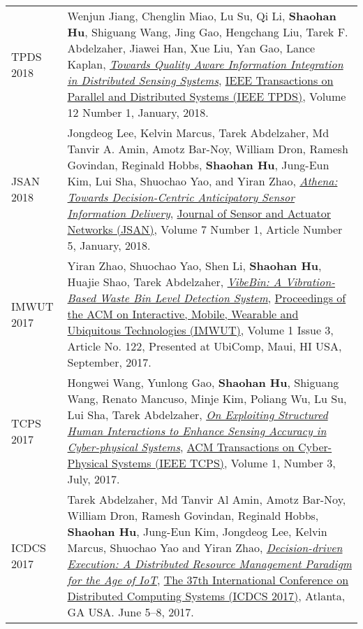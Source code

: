 \begin{longtabu}{p{.51\sectionwidth} p{.78\resumewidth}}
{\sc TPDS 2018}\hypertarget{jiang2018tpds}{} &
Wenjun Jiang, Chenglin Miao, Lu Su, Qi Li, \textbf{Shaohan Hu}, Shiguang Wang, Jing Gao, Hengchang Liu, Tarek F. Abdelzaher, Jiawei Han, Xue Liu, Yan Gao, Lance Kaplan,
\href{http://ieeexplore.ieee.org/document/7940106/}{\emph{Towards Quality Aware Information Integration in Distributed Sensing Systems}},
\href{https://www.computer.org/web/tpds}{\textsf{IEEE Transactions on Parallel and Distributed Systems (IEEE TPDS)}},
Volume 12 Number 1, January, 2018. \\

{\sc JSAN 2018}\hypertarget{lee2018jsan}{} &
Jongdeog Lee, Kelvin Marcus, Tarek Abdelzaher, Md Tanvir A. Amin, Amotz Bar-Noy, William Dron, Ramesh Govindan, Reginald Hobbs, \textbf{Shaohan Hu}, Jung-Eun Kim, Lui Sha, Shuochao Yao, and Yiran Zhao,
\href{http://www.mdpi.com/2224-2708/7/1/5/htm}{\emph{Athena: Towards Decision-Centric Anticipatory Sensor Information Delivery}},
\href{http://www.mdpi.com/journal/jsan}{\textsf{Journal of Sensor and Actuator Networks (JSAN)}},
Volume 7 Number 1, Article Number 5, January, 2018. \\

{\sc IMWUT 2017}\hypertarget{zhao2017imwut}{} &
Yiran Zhao, Shuochao Yao, Shen Li, \textbf{Shaohan Hu}, Huajie Shao, Tarek Abdelzaher,
\href{https://dl.acm.org/citation.cfm?id=3132027}{\emph{VibeBin: A Vibration-Based Waste Bin Level Detection System}},
\href{https://imwut.acm.org/}{\textsf{Proceedings of the ACM on Interactive, Mobile, Wearable and Ubiquitous Technologies (IMWUT)}},
Volume 1 Issue 3, Article No. 122, Presented at UbiComp, Maui, HI USA, September, 2017. \\

{\sc TCPS 2017}\hypertarget{wang2017tcps}{} &
Hongwei Wang, Yunlong Gao, \textbf{Shaohan Hu}, Shiguang Wang, Renato Mancuso, Minje Kim, Poliang Wu, Lu Su, Lui Sha, Tarek Abdelzaher,
\href{http://dl.acm.org/citation.cfm?id=3064006}{\emph{On Exploiting Structured Human Interactions to Enhance Sensing Accuracy in Cyber-physical Systems}},
\href{http://tcps.acm.org/}{\textsf{ACM Transactions on Cyber-Physical Systems (IEEE TCPS)}},
Volume 1, Number 3, July, 2017. \\

{\sc ICDCS 2017}\hypertarget{abdelzaher2017icdcs}{} &
Tarek Abdelzaher, Md Tanvir Al Amin, Amotz Bar-Noy, William Dron, Ramesh Govindan, Reginald Hobbs, \textbf{Shaohan Hu}, Jung-Eun Kim, Jongdeog Lee, Kelvin Marcus, Shuochao Yao and Yiran Zhao,
\href{http://ieeexplore.ieee.org/document/7980121}{\emph{Decision-driven Execution: A Distributed Resource Management Paradigm for the Age of IoT}},
\href{http://icdcs2017.gatech.edu/}{\textsf{The 37th International Conference on Distributed Computing Systems (ICDCS 2017)}},
Atlanta, GA USA. June 5--8, 2017. \\


\end{longtabu}
